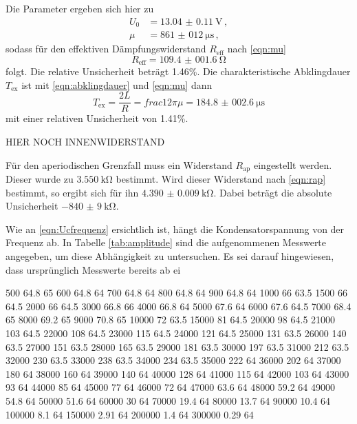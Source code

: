 Die Parameter ergeben sich hier zu
\begin{align*}
  U_0 &= \SI{13.04(011)}{\volt}\,, \\
  \mu &= \SI{861(012)}{\micro\second}\,,
\end{align*}
sodass für den effektiven Dämpfungswiderstand $R_\text{eff}$ nach \eqref{eqn:mu}
\begin{equation*}
  R_\text{eff} = \SI{109.4(0016)}{\ohm}
\end{equation*}
folgt. Die relative Unsicherheit beträgt 1.46\%. Die charakteristische
Abklingdauer $T_\text{ex}$ ist mit \eqref{eqn:abklingdauer} und \eqref{eqn:mu} dann
\begin{equation*}
  T_\text{ex} = \frac{2L}{R} = frac{1}{2\pi \mu} = \SI{184.8(0026)}{\micro\second}
\end{equation*}
mit einer relativen Unsicherheit von 1.41\%.

HIER NOCH INNENWIDERSTAND

Für den aperiodischen Grenzfall muss ein Widerstand $R_\text{ap}$ eingestellt werden.
Dieser wurde zu $\SI{3.550}{\kilo\ohm}$ bestimmt. Wird dieser Widerstand nach
\eqref{eqn:rap} bestimmt, so ergibt sich für ihn $\SI{4.390(0009)}{\kilo\ohm}$.
Dabei beträgt die absolute Unsicherheit $\SI{-840(9)}{\kilo\ohm}$.

Wie an \eqref{eqn:Ucfrequenz} ersichtlich ist, hängt die Kondensatorspannung von
der Frequenz ab. In Tabelle \ref{tab:amplitude} sind die aufgenommenen Messwerte
angegeben, um diese Abhängigkeit zu untersuchen. Es sei darauf hingewiesen, dass
ursprünglich Messwerte bereits ab ei

500	64.8		65
600	64.8		64
700	64.8		64
800	64.8		64
900	64.8		64
1000	66		63.5
1500	66		64.5
2000	66		64.5
3000	66.8		66
4000	66.8		64
5000	67.6		64
6000	67.6		64.5
7000	68.4		65
8000	69.2		65
9000	70.8		65
10000	72		63.5
15000	81		64.5
20000	98		64.5
21000	103		64.5
22000	108		64.5
23000	115		64.5
24000	121		64.5
25000	131		63.5
26000	140		63.5
27000	151		63.5
28000	165		63.5
29000	181		63.5
30000	197		63.5
31000	212		63.5
32000	230		63.5
33000	238		63.5
34000	234		63.5
35000	222		64
36000	202		64
37000	180		64
38000	160		64
39000	140		64
40000	128		64
41000	115		64
42000	103		64
43000	93		64
44000	85		64
45000	77		64
46000	72		64
47000	63.6		64
48000	59.2		64
49000	54.8		64
50000	51.6		64
60000	30		64
70000	19.4		64
80000	13.7		64
90000	10.4		64
100000	8.1		64
150000	2.91		64
200000	1.4		64
300000	0.29		64
